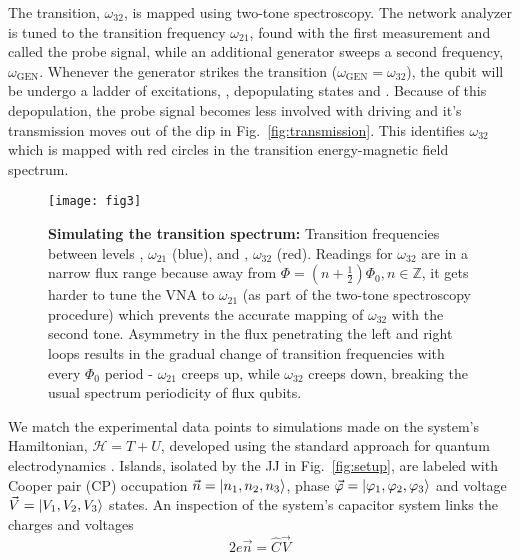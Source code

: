 The  \ilra{}  transition,  $\omega_{32}$,  is
mapped using  two-tone spectroscopy.  The  network analyzer
is tuned to the transition frequency $ \omega_{21} $, found
with  the first  measurement and  called the  probe signal,
while an  additional generator  sweeps a  second frequency,
$  \omega_{\text{GEN}} $.   Whenever the  generator strikes
the             \ira{}             transition
($\omega_{\text{GEN}} =  \omega_{32} $), the qubit  will be
undergo     a    ladder     of    excitations,     
     
,  depopulating   states     and  .
Because of this depopulation, the probe signal becomes less
involved with  driving and  it's transmission moves  out of
the  dip in  Fig.~\ref{fig:transmission}.  This  identifies
$\omega_{32}$  which  is mapped  with  red  circles in  the
transition energy-magnetic field spectrum.



\begin{figure}[h]
  \texttt{[image: fig3]}
  \caption{\small    \textbf{Simulating   the    transition
      spectrum:}  Transition   frequencies  between  levels
    \ilra  {}, $  \omega_{21}  $ (blue),  and
       \ilra   {},  $   \omega_{32}$   (red).
    Readings for $ \omega_{32} $ are in a narrow flux range
    because                    away                    from
    $ \Phi = (n  + \frac{1}{2})\Phi_0, n\in\mathbb{Z} $, it
    gets harder to tune the VNA to $ \omega_{21} $ (as part
    of the two-tone  spectroscopy procedure) which prevents
    the accurate mapping of $ \omega_{32} $ with the second
    tone.  Asymmetry  in the flux penetrating  the left and
    right loops results in the gradual change of transition
    frequencies   with  every   $  \Phi_{0}   $  period   -
    $\omega_{21}$  creeps  up, while  $\omega_{32}$  creeps
    down, breaking  the usual spectrum periodicity  of flux
    qubits.  \label{fig:experiment}}
\end{figure}

We match  the experimental data points  to simulations made
on  the system's  Hamiltonian, $  \mathcal{H}  = T  + U  $,
developed   using  the   standard   approach  for   quantum
electrodynamics  \cite{orlando1999}.  Islands,  isolated by
the  JJ in  Fig.~\ref{fig:setup}, are  labeled with  Cooper
pair (CP)  occupation $ \vec{n}  = \Ket{n_1, n_2,  n_3} $,
phase
$ \vec{\varphi} =  \Ket{\varphi_1, \varphi_2, \varphi_3} $
and  voltage  $  \vec{V}  = \Ket{V_{1},  V_{2},  V_{3}}  $
states.   An inspection  of the  system's capacitor  system
links the charges and voltages
\begin{equation}
  \label{eq:link}
  2e\vec{n} = \hat{C}\vec{V}
\end{equation}

